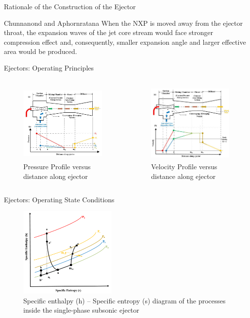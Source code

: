 \begin{frame}{Rationale of the Construction of the Ejector}
    \begin{block}{Chunnanond and Aphornratana\cite{chunnanond2004experimental}}
     When the NXP is moved away from the ejector throat, the expansion waves of the jet core stream would face stronger compression effect and, consequently, smaller expansion angle and larger effective area would be produced.
    \end{block}
\end{frame}

\begin{frame}{Ejectors: Operating Principles}
    \begin{columns}
    \begin{figure}[h]
      \centering
      \includegraphics[height=4cm]{images/Ejectorpressureprofile1.JPG}
      \caption{\scriptsize Pressure Profile versus distance along ejector}
   \end{figure}
    \begin{figure}[h]
    \centering
    \includegraphics[height=4cm]{images/EjectorVelocityprofile.JPG}
    \caption{\scriptsize Velocity Profile versus distance along ejector}
    \end{figure}
\end{columns}
\end{frame}

\begin{frame}{Ejectors: Operating State Conditions}
    \begin{figure}[h]
    \centering
   \includegraphics[height=4.5cm]{images/ejectorhsd.PNG}
    \caption{\scriptsize \centering Specific enthalpy (h) – Specific entropy (s) diagram of the processes inside the single-phase subsonic ejector}
    \label{fig:ejectorhsd}
\end{figure}
\end{frame}

